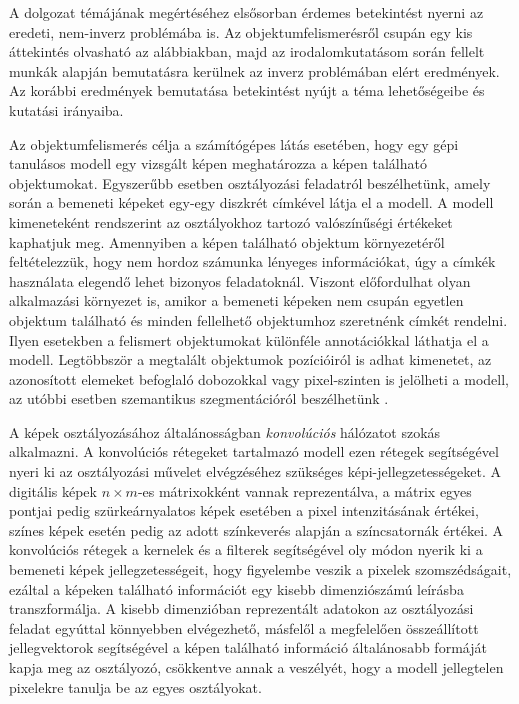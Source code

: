
A dolgozat témájának megértéséhez elsősorban érdemes betekintést nyerni az eredeti, nem-inverz problémába is. Az objektumfelismerésről csupán egy kis áttekintés olvasható az alábbiakban, majd az irodalomkutatásom során fellelt munkák alapján bemutatásra kerülnek az inverz problémában elért eredmények. Az korábbi eredmények bemutatása betekintést nyújt a téma lehetőségeibe és kutatási irányaiba.

Az objektumfelismerés célja a számítógépes látás esetében, hogy egy gépi tanulásos modell egy vizsgált képen meghatározza a képen található objektumokat. Egyszerűbb esetben osztályozási feladatról beszélhetünk, amely során a bemeneti képeket egy-egy diszkrét címkével látja el a modell. A modell kimeneteként rendszerint az osztályokhoz tartozó valószínűségi értékeket kaphatjuk meg. Amennyiben a képen található objektum környezetéről feltételezzük, hogy nem hordoz számunka lényeges információkat, úgy a címkék használata elegendő lehet bizonyos feladatoknál. Viszont előfordulhat olyan alkalmazási környezet is, amikor a bemeneti képeken nem csupán egyetlen objektum található és minden fellelhető objektumhoz szeretnénk címkét rendelni. Ilyen esetekben a felismert objektumokat különféle annotációkkal láthatja el a modell. Legtöbbször a megtalált objektumok pozícióiról is adhat kimenetet, az azonosított elemeket befoglaló dobozokkal \cite{redmon2016you} vagy pixel-szinten is jelölheti a modell, az utóbbi esetben szemantikus szegmentációról beszélhetünk \cite{long2015fully}.

A képek osztályozásához általánosságban \textit{konvolúciós} hálózatot szokás alkalmazni. A konvolúciós rétegeket tartalmazó modell ezen rétegek segítségével nyeri ki az osztályozási művelet elvégzéséhez szükséges képi-jellegzetességeket. A digitális képek $n \times m$-es mátrixokként vannak reprezentálva, a mátrix egyes pontjai pedig szürkeárnyalatos képek esetében a pixel intenzitásának értékei, színes képek esetén pedig az adott színkeverés alapján a színcsatornák értékei. A konvolúciós rétegek a kernelek és a filterek segítségével oly módon nyerik ki a bemeneti képek jellegzetességeit, hogy figyelembe veszik a pixelek szomszédságait, ezáltal a képeken található információt egy kisebb dimenziószámú leírásba transzformálja. A kisebb dimenzióban reprezentált adatokon az osztályozási feladat egyúttal könnyebben elvégezhető, másfelől a megfelelően összeállított jellegvektorok segítségével a képen található információ általánosabb formáját kapja meg az osztályozó, csökkentve annak a veszélyét, hogy a modell jellegtelen pixelekre tanulja be az egyes osztályokat.

